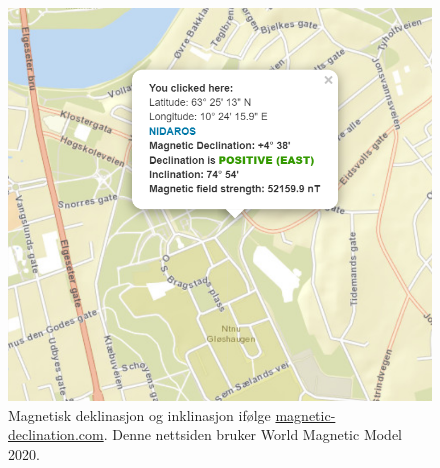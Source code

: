 \begin{figure}
    \centering
    \includegraphics{img/WMM.png}
    \caption{Magnetisk deklinasjon og inklinasjon ifølge \href{https://www.magnetic-declination.com/}{magnetic-declination.com}. Denne nettsiden bruker World Magnetic Model 2020.}
    \label{fig:WMM}
\end{figure}